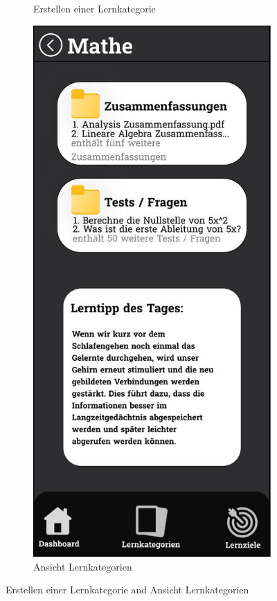 \begin{figure}[htbp]
\begin{subfigure}[b]{0.45\linewidth}
    \caption{Erstellen einer Lernkategorie}
    \label{fig:lernkategorie-create}
  \end{subfigure}
  \hfill
  \begin{subfigure}[b]{0.45\linewidth}
    \centering
    \includegraphics[width=\linewidth]{images/Mockups/Lernkategorie.JPG}
    \caption{Ansicht Lernkategorien}
    \label{fig:lernkategorie-ansicht}
  \end{subfigure}
  \caption{Erstellen einer Lernkategorie and Ansicht Lernkategorien}
  \label{fig:lernkategorie}
\end{figure}

